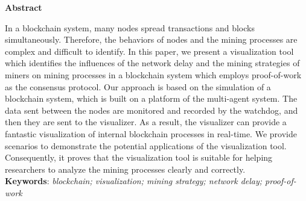 \thispagestyle{plain}
\vspace*{\fill}
    \begin{center}
        \Large
        \textbf{Abstract}
    \end{center}
    
    \vspace{1cm}
    
    In a blockchain system, many nodes spread transactions and blocks simultaneously. Therefore, the behaviors of nodes and the mining processes are complex and difficult to identify. In this paper, we present a visualization tool which identifies the influences of the network delay and the mining strategies of miners on mining processes in a blockchain system which employs proof-of-work as the consensus protocol. Our approach is based on the simulation of a blockchain system, which is built on a platform of the multi-agent system. The data sent between the nodes are monitored and recorded by the watchdog, and then they are sent to the visualizer. As a result, the visualizer can provide a fantastic visualization of internal blockchain processes in real-time. We provide scenarios to demonstrate the potential applications of the visualization tool. Consequently, it proves that the visualization tool is suitable for helping researchers to analyze the mining processes clearly and correctly. \\
    
    \textbf{Keywords}: \textit{blockchain; visualization; mining strategy; network delay; proof-of-work}
\vspace*{\fill}

